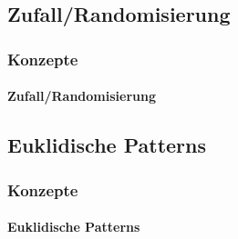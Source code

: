 \documentclass{beamer}
\begin{document}
\subsection{Zufall/Randomisierung}
\begin{frame}
  \frametitle{Konzepte}
  \framesubtitle{Zufall/Randomisierung}
\end{frame}

\subsection{Euklidische Patterns}
\begin{frame}
  \frametitle{Konzepte}
  \framesubtitle{Euklidische Patterns}
\end{frame}
\end{document}
